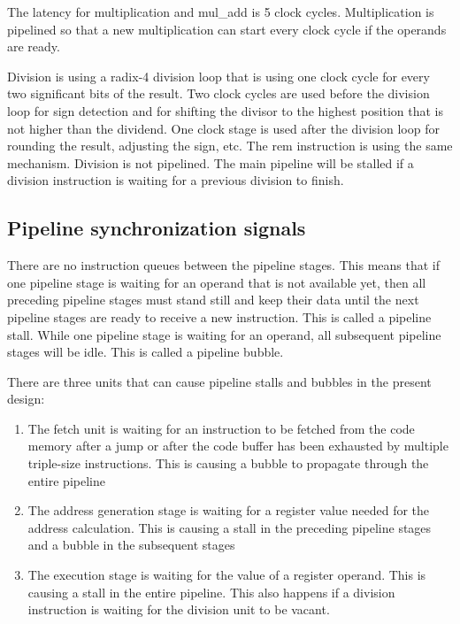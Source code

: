 \documentclass[11pt,a4paper,oneside,openright]{report}
\newcommand{\vv}{ \vspace{2mm} }   %
\begin{document}
The latency for multiplication and mul\_add is 5 clock cycles. Multiplication is pipelined so that a new multiplication can start every clock cycle if the operands are ready. 
\vv

Division is using a radix-4 division loop that is using one clock cycle for every two significant bits of the result. Two clock cycles are used before the division loop for sign detection and for shifting the divisor to the highest position that is not higher than the dividend. One clock stage is used after the division loop for rounding the result, adjusting the sign, etc. The rem instruction is using the same mechanism. 
Division is not pipelined. The main pipeline will be stalled if a division instruction is waiting for a previous division to finish.
\vv


\subsection{Pipeline synchronization signals}
There are no instruction queues between the pipeline stages. This means that if one pipeline stage is waiting for an operand that is not available yet, then all preceding pipeline stages must stand still and keep their data until the next pipeline stages are ready to receive a new instruction. This is called a pipeline stall. While one pipeline stage is waiting for an operand, all subsequent pipeline stages will be idle. This is called a pipeline bubble.
\vv

There are three units that can cause pipeline stalls and bubbles in the present design:
\vv

\begin{enumerate}
\item The fetch unit is waiting for an instruction to be fetched from the code memory after a jump or after the code buffer has been exhausted by multiple triple-size instructions. This is causing a bubble to propagate through the entire pipeline
\item The address generation stage is waiting for a register value needed for the address calculation. This is causing a stall in the preceding pipeline stages and a bubble in the subsequent stages
\item The execution stage is waiting for the value of a register operand. This is causing a stall in the entire pipeline. This also happens if a division instruction is waiting for the division unit to be vacant.
\end{enumerate}
\vv
\end{document}
